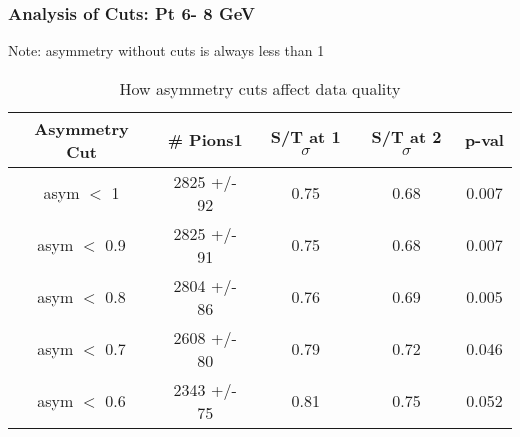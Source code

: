 \frame
{
\frametitle{Analysis of Cuts: Pt  6- 8 GeV}
Note: asymmetry without cuts is always less than 1
\begin{table}
\caption{How asymmetry cuts affect data quality}
\centering
\begin{tabular}{c c c c c}
\hline\hline
Asymmetry Cut & \# Pions1 & S/T at 1 $\sigma$ & S/T at 2 $\sigma$ & p-val \\ [0.5ex]
\hline
asym $<$ 1 & 2825 +/-   92 & 0.75 & 0.68 & 0.007 \\ %
asym $<$ 0.9 & 2825 +/-   91 & 0.75 & 0.68 & 0.007 \\ %
asym $<$ 0.8 & 2804 +/-   86 & 0.76 & 0.69 & 0.005 \\ %
asym $<$ 0.7 & 2608 +/-   80 & 0.79 & 0.72 & 0.046 \\ %
asym $<$ 0.6 & 2343 +/-   75 & 0.81 & 0.75 & 0.052 \\ %
[1ex]
\hline
\end{tabular}
\label{table:nonlin}
\end{table}
}
